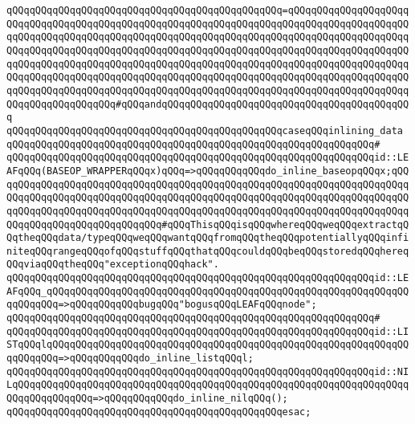 \verb|qQQqqQQqqQQqqQQqqQQqqQQqqQQqqQQqqQQqqQQqqQQqqQQq=qQQqqQQqqQQqqQQqqQQqqQQqqQQqqQQqqQQqqQQqqQQqqQQqqQQqqQQqqQQqqQQqqQQqqQQqqQQqqQQqqQQqqQQqqQQqqQQqqQQqqQQqqQQqqQQqqQQqqQQqqQQqqQQqqQQqqQQqqQQqqQQqqQQqqQQqqQQqqQQqqQQqqQQqqQQqqQQqqQQqqQQqqQQqqQQqqQQqqQQqqQQqqQQqqQQqqQQqqQQqqQQqqQQqqQQqqQQqqQQqqQQqqQQqqQQqqQQqqQQqqQQqqQQqqQQqqQQqqQQqqQQqqQQqqQQqqQQqqQQqqQQqqQQqqQQqqQQqqQQqqQQqqQQqqQQqqQQqqQQqqQQqqQQqqQQqqQQqqQQqqQQqqQQqqQQqqQQqqQQqqQQqqQQqqQQqqQQqqQQqqQQqqQQqqQQqqQQqqQQqqQQqqQQqqQQqqQQqqQQqqQQqqQQqqQQqqQQqqQQq#qQQqandqQQqqQQqqQQqqQQqqQQqqQQqqQQqqQQqqQQqqQQqqQQq|\newline
\verb|qQQqqQQqqQQqqQQqqQQqqQQqqQQqqQQqqQQqqQQqqQQqqQQqcaseqQQqinlining_data|\newline
\verb|qQQqqQQqqQQqqQQqqQQqqQQqqQQqqQQqqQQqqQQqqQQqqQQqqQQqqQQqqQQqqQQq#|\newline
\verb|qQQqqQQqqQQqqQQqqQQqqQQqqQQqqQQqqQQqqQQqqQQqqQQqqQQqqQQqqQQqqQQqid::LEAFqQQq(BASEOP_WRAPPERqQQqx)qQQq=>qQQqqQQqqQQqdo_inline_baseopqQQqx;qQQqqQQqqQQqqQQqqQQqqQQqqQQqqQQqqQQqqQQqqQQqqQQqqQQqqQQqqQQqqQQqqQQqqQQqqQQqqQQqqQQqqQQqqQQqqQQqqQQqqQQqqQQqqQQqqQQqqQQqqQQqqQQqqQQqqQQqqQQqqQQqqQQqqQQqqQQqqQQqqQQqqQQqqQQqqQQqqQQqqQQqqQQqqQQqqQQqqQQqqQQqqQQqqQQqqQQqqQQqqQQqqQQqqQQqqQQqqQQq#qQQqThisqQQqisqQQqwhereqQQqweqQQqextractqQQqtheqQQqdata/typeqQQqweqQQqwantqQQqfromqQQqtheqQQqpotentiallyqQQqinfiniteqQQqrangeqQQqofqQQqstuffqQQqthatqQQqcouldqQQqbeqQQqstoredqQQqhereqQQqviaqQQqtheqQQq"exceptionqQQqhack".|\newline
\verb|qQQqqQQqqQQqqQQqqQQqqQQqqQQqqQQqqQQqqQQqqQQqqQQqqQQqqQQqqQQqqQQqid::LEAFqQQq_qQQqqQQqqQQqqQQqqQQqqQQqqQQqqQQqqQQqqQQqqQQqqQQqqQQqqQQqqQQqqQQqqQQqqQQq=>qQQqqQQqqQQqbugqQQq"bogusqQQqLEAFqQQqnode";|\newline
\verb|qQQqqQQqqQQqqQQqqQQqqQQqqQQqqQQqqQQqqQQqqQQqqQQqqQQqqQQqqQQqqQQq#|\newline
\verb|qQQqqQQqqQQqqQQqqQQqqQQqqQQqqQQqqQQqqQQqqQQqqQQqqQQqqQQqqQQqqQQqid::LISTqQQqlqQQqqQQqqQQqqQQqqQQqqQQqqQQqqQQqqQQqqQQqqQQqqQQqqQQqqQQqqQQqqQQqqQQqqQQq=>qQQqqQQqqQQqdo_inline_listqQQql;|\newline
\verb|qQQqqQQqqQQqqQQqqQQqqQQqqQQqqQQqqQQqqQQqqQQqqQQqqQQqqQQqqQQqqQQqid::NILqQQqqQQqqQQqqQQqqQQqqQQqqQQqqQQqqQQqqQQqqQQqqQQqqQQqqQQqqQQqqQQqqQQqqQQqqQQqqQQqqQQq=>qQQqqQQqqQQqdo_inline_nilqQQq();|\newline
\verb|qQQqqQQqqQQqqQQqqQQqqQQqqQQqqQQqqQQqqQQqqQQqqQQqesac;|\newline

